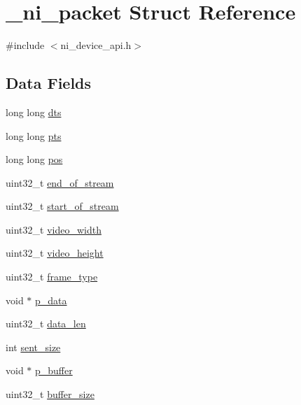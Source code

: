 \hypertarget{struct__ni__packet}{}\section{\+\_\+ni\+\_\+packet Struct Reference}
\label{struct__ni__packet}


{\ttfamily \#include $<$ni\+\_\+device\+\_\+api.\+h$>$}

\subsection*{Data Fields}
\begin{DoxyCompactItemize}
\item 
long long \mbox{\hyperlink{struct__ni__packet_a5b339e32ee63aeb67076062ba959ca51}{dts}}
\item 
long long \mbox{\hyperlink{struct__ni__packet_aa549d909938aa26820c29b020cd43ad6}{pts}}
\item 
long long \mbox{\hyperlink{struct__ni__packet_ad699b0e99e873ba04ecb17f6fa8747e3}{pos}}
\item 
uint32\+\_\+t \mbox{\hyperlink{struct__ni__packet_a7cd60f79487efa52ff89303532a085fb}{end\+\_\+of\+\_\+stream}}
\item 
uint32\+\_\+t \mbox{\hyperlink{struct__ni__packet_a3136d4ad964deb437b6aaadcb031d90f}{start\+\_\+of\+\_\+stream}}
\item 
uint32\+\_\+t \mbox{\hyperlink{struct__ni__packet_a94c61f9d8155afb285177936e9fa30ce}{video\+\_\+width}}
\item 
uint32\+\_\+t \mbox{\hyperlink{struct__ni__packet_af65e7328fad30f40770959957538da7c}{video\+\_\+height}}
\item 
uint32\+\_\+t \mbox{\hyperlink{struct__ni__packet_acf47f9b2777759386086e94ed5962f19}{frame\+\_\+type}}
\item 
void $\ast$ \mbox{\hyperlink{struct__ni__packet_ab5b6056a4691bb8526e3a1ca657edeb4}{p\+\_\+data}}
\item 
uint32\+\_\+t \mbox{\hyperlink{struct__ni__packet_a231d88a2076c53df88d8ffd7eb1c50ec}{data\+\_\+len}}
\item 
int \mbox{\hyperlink{struct__ni__packet_ab9bf0c4ff7f421a313d647422715028d}{sent\+\_\+size}}
\item 
void $\ast$ \mbox{\hyperlink{struct__ni__packet_ac5f1b38d538f42b0a45acd833ea5fc65}{p\+\_\+buffer}}
\item 
uint32\+\_\+t \mbox{\hyperlink{struct__ni__packet_ab4bab919e0d995ad7249474cd9028105}{buffer\+\_\+size}}
\end{DoxyCompactItemize}


